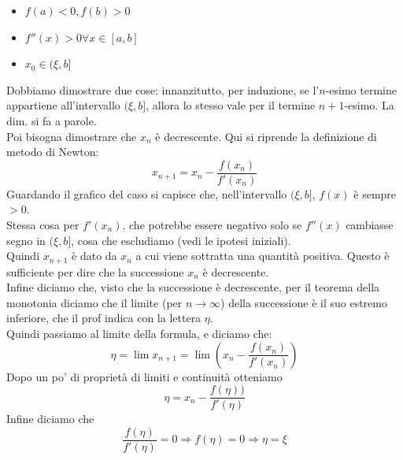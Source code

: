 \begin{itemize}
    \item $f(a)<0, f(b)>0$
    \item $f''(x)>0 \forall x \in [a,b]$
    \item $x_0 \in (\xi,b]$
\end{itemize}
Dobbiamo dimostrare due cose: innanzitutto, per induzione, se l'$n$-esimo termine appartiene all'intervallo $(\xi,b]$, allora lo stesso vale per il termine $n+1$-esimo. La dim. si fa a parole.\\
Poi bisogna dimostrare che ${x_n}$ è decrescente. Qui si riprende la definizione di metodo di Newton:
\begin{displaymath}
    x_{n+1} = x_n-\frac{f(x_n)}{f'(x_n)}
\end{displaymath}
Guardando il grafico del caso  si capisce che, nell'intervallo $(\xi,b]$, $f(x)$ è sempre $>0$.\\
Stessa cosa per $f'(x_n)$, che potrebbe essere negativo solo se $f''(x)$ cambiasse segno in $(\xi,b]$, cosa che escludiamo (vedi le ipotesi iniziali).\\
Quindi $x_{n+1}$ è dato da $x_n$ a cui viene sottratta una quantità positiva. Questo è sufficiente per dire che la successione ${x_n}$ è decrescente.\\
Infine diciamo che, visto che la successione è decrescente, per il teorema della monotonia diciamo che il limite (per $n\rightarrow \infty$) della successione è il suo estremo inferiore, che il prof indica con la lettera $\eta$.\\
Quindi passiamo al limite della formula, e diciamo che:
\begin{displaymath}
    \eta=\lim_{}x_{n+1}=\lim_{}\left ( x_n-\frac{f(x_n)}{f'(x_n)} \right )
\end{displaymath}
Dopo un po' di proprietà di limiti e continuità otteniamo
\begin{displaymath}
    \eta= x_n-\frac{f(\eta))}{f'(\eta)}
\end{displaymath}
Infine diciamo che
\begin{displaymath}
    \frac{f(\eta)}{f'(\eta)}=0 \Rightarrow f(\eta)=0\Rightarrow \eta = \xi
\end{displaymath}

